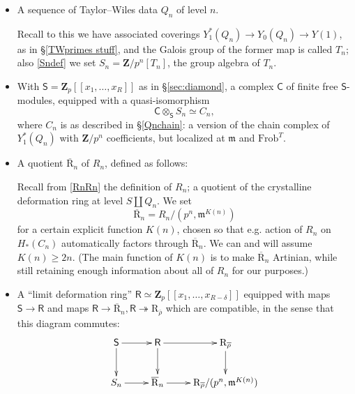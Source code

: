 \documentclass[10pt]{amsart}
\newcommand{\Z}{\mathbf{Z}}
\newcommand{\usbR}{\overline{\mathrm{R}}}
\newcommand{\defring}{\mathrm{R}_{\rhobar}}
\newcommand{\rhobar}{\overline{\rho}}
\newcommand{\Frob}{\mathrm{Frob}}
\newcommand{\Cinf}{\mathsf{C}}
\newcommand{\Sinf}{\mathsf{S}}
\newcommand{\Rinf}{\mathsf{R}}
\newcommand{\ramprimes}{S}
\theoremstyle{remark}
\begin{document}
\begin{itemize}
 
\item[(a)] A sequence of Taylor--Wiles data $Q_n$ of level $n$.

 Recall to this we have associated coverings $Y_1^*(Q_n) \rightarrow  Y_0(Q_n) \rightarrow Y(1)$,
as in \S \ref{TWprimes stuff}, and the Galois group of the former map is called $T_n$; also \eqref{Sndef} we set $S_n = \Z/p^n[T_n]$, the group algebra of $T_n$. 

\item[(b)] With $\Sinf = \Z_p[[x_1, \dots, x_R]]$ as in
\S \ref{sec:diamond}, 
a complex $\Cinf$ of finite free $\Sinf$-modules, 
equipped with 
a quasi-isomorphism \begin{equation} \label{Descent} \Cinf \otimes_{\Sinf} S_n  \simeq C_n,\end{equation}   %
where $C_n$ is as described in \S \ref{Qnchain}: a version of the chain complex of $Y_1^*(Q_n)$ with $\Z/p^n$ coefficients,
but localized at $\mathfrak{m}$ and $\Frob^T$. 
%
%
%



%
%
%
%
%
\medskip
\item[(c)]  
 A quotient $\usbR_n$ of $R_n$,   \index{$\usbR_n$} 
defined as follows:

Recall   from \eqref{RnRn} the definition of $R_n$; a quotient of the crystalline deformation ring
at level  $\ramprimes \coprod Q_n$.  We set \begin{equation} \label{goef} \usbR_n = R_n/(p^n, \mathfrak{m}^{K(n)})\end{equation}
for a certain explicit function $K(n)$, chosen so that  e.g.  action of $R_n$ on $H_*(C_n)$  
automatically factors through $\usbR_n$.  We can and will assume $K(n) \geq 2n$.   (The main function of $K(n)$ is to make $\usbR_n$ Artinian, 
while still retaining enough information about all of $R_n$ for our purposes.) 

\item[(d)]

 A ``limit deformation ring'' $\Rinf \simeq \Z_p[[x_1, \dots, x_{R-\delta}]]$  equipped with 
maps  $\Sinf \rightarrow \Rinf$ and maps $\Rinf \rightarrow \usbR_n, \Rinf \twoheadrightarrow \defring$   which are compatible,
in the sense that this diagram commutes: 
    \begin{equation} \label{SinftySn}
 \xymatrix{
\Sinf  \ar[r] \ar[d] &   \Rinf  \ar[d] \ar[r]  & \defring   \ar[d] \\
S_n   \ar[r]   &   \usbR_n   \ar[r] & \defring/  (p^n, \mathfrak{m}^{K(n)}) }
\end{equation}


\end{itemize}
\end{document}
